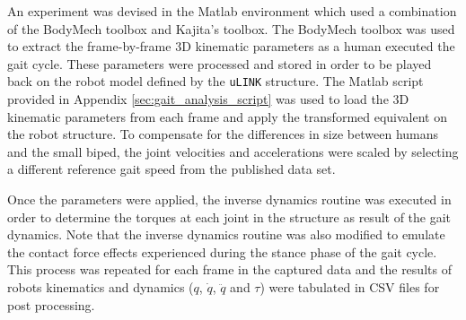 An experiment was devised in the Matlab environment which used a combination of the BodyMech toolbox and Kajita's toolbox. The BodyMech toolbox was used to extract the frame-by-frame 3D kinematic parameters as a human executed the gait cycle. These parameters were processed and stored in order to be played back on the robot model defined by the \texttt{uLINK} structure. The Matlab script provided in Appendix \ref{sec:gait_analysis_script} was used to load the 3D kinematic parameters from each frame and apply the transformed equivalent on the robot structure. To compensate for the differences in size between humans and the small biped, the joint velocities and accelerations were scaled by selecting a different reference gait speed from the published data set. 
	
Once the parameters were applied, the inverse dynamics routine was executed in order to determine the torques at each joint in the structure as result of the gait dynamics. Note that the inverse dynamics routine was also modified to emulate the contact force effects experienced during the stance phase of the gait cycle. This process was repeated for each frame in the captured data and the results of robots kinematics and dynamics ($q$, $\dot{q}$, $\ddot{q}$ and $\tau$) were tabulated in CSV files for post processing. 
	
